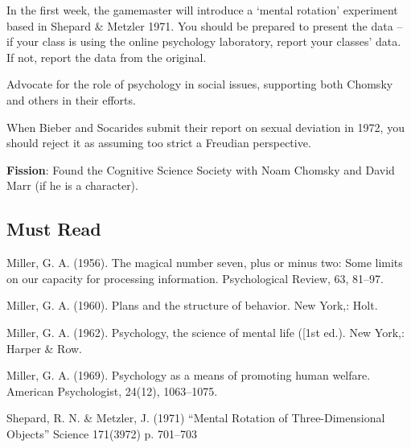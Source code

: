 \begin{refsection}
In the first week, the gamemaster will introduce a `mental rotation' experiment based in Shepard \& Metzler 1971. You should be prepared to present the data – if your class is using the online psychology laboratory, report your classes' data. If not, report the data from the original.

Advocate for the role of psychology in social issues, supporting both Chomsky and others in their efforts.

When Bieber and Socarides submit their report on sexual deviation in 1972, you should reject it as assuming too strict a Freudian perspective.

\textbf{Fission}: Found the Cognitive Science Society with Noam Chomsky and David Marr (if he is a character).

\subsection{Must Read}
\label{mustread}

Miller, G. A. (1956). The magical number seven, plus or minus two: Some limits on our capacity for processing information. Psychological Review, 63, 81--97.

Miller, G. A. (1960). Plans and the structure of behavior. New York,: Holt.

Miller, G. A. (1962). Psychology, the science of mental life ([1st ed.). New York,: Harper \& Row.

Miller, G. A. (1969). Psychology as a means of promoting human welfare. American Psychologist, 24(12), 1063--1075.

Shepard, R. N. \& Metzler, J. (1971) ``Mental Rotation of Three-Dimensional Objects'' Science 171(3972) p. 701--703


\end{refsection}

